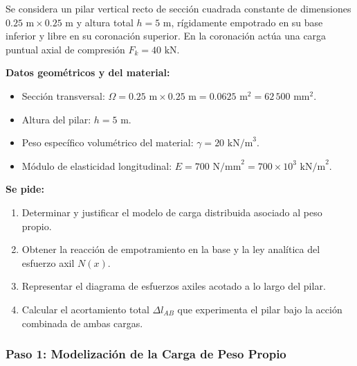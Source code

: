\begin{tcolorbox}[colback=blue!5!white,colframe=blue!75!black,title=\textbf{Problema 9 (Ejemplo de Clase): Pilar de Sección Cuadrada con Carga en Cabeza y Peso Propio}]
    Se considera un pilar vertical recto de sección cuadrada constante de dimensiones $0.25\text{ m} \times 0.25\text{ m}$ y altura total $h = 5\text{ m}$, rígidamente empotrado en su base inferior y libre en su coronación superior. En la coronación actúa una carga puntual axial de compresión $F_k = 40\text{ kN}$.

    \textbf{Datos geométricos y del material:}
    \begin{itemize}
        \item Sección transversal: $\Omega = 0.25\text{ m} \times 0.25\text{ m} = 0.0625\text{ m}^2 = 62\,500\text{ mm}^2$.
        \item Altura del pilar: $h = 5\text{ m}$.
        \item Peso específico volumétrico del material: $\gamma = 20\text{ kN/m}^3$.
        \item Módulo de elasticidad longitudinal: $E = 700\text{ N/mm}^2 = 700 \times 10^3\text{ kN/m}^2$.
    \end{itemize}

    \textbf{Se pide:}
    \begin{enumerate}[label=\alph*)]
        \item Determinar y justificar el modelo de carga distribuida asociado al peso propio.
        \item Obtener la reacción de empotramiento en la base y la ley analítica del esfuerzo axil $N(x)$.
        \item Representar el diagrama de esfuerzos axiles acotado a lo largo del pilar.
        \item Calcular el acortamiento total $\Delta l_{AB}$ que experimenta el pilar bajo la acción combinada de ambas cargas.
    \end{enumerate}
\end{tcolorbox}

\subsubsection*{Paso 1: Modelización de la Carga de Peso Propio}

